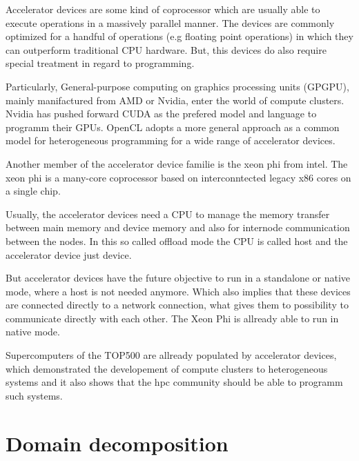Accelerator devices are some kind of coprocessor which are usually
able to execute operations in a massively parallel manner.  The
devices are commonly optimized for a handful of operations (e.g
floating point operations) in which they can outperform traditional
CPU hardware. But, this devices do also require special treatment in
regard to programming.

Particularly, General-purpose computing on graphics processing units
(GPGPU), mainly manifactured from AMD or Nvidia, enter the world of
compute clusters. Nvidia has pushed forward CUDA\cite{ref:cuda} as the
prefered model and language to programm their
GPUs. OpenCL\cite{ref:opencl} adopts a more general approach as a
common model for heterogeneous programming for a wide range of
accelerator devices.

Another member of the accelerator device familie is the xeon
phi\cite{ref:xeon_phi} from intel. The xeon phi is a many-core
coprocessor based on interconntected legacy x86 cores on a single chip.

Usually, the accelerator devices need a CPU to manage the memory
transfer between main memory and device memory and also for internode
communication between the nodes. In this so called offload mode the
CPU is called host and the accelerator device just device.

But accelerator devices have the future objective to run in a
standalone or native mode, where a host is not needed anymore. 
Which also implies that these devices are connected directly to
a network connection, what gives them to possibility to communicate
directly with each other. The Xeon Phi is allready able to run in native mode.

Supercomputers of the TOP500 are allready populated by accelerator
devices, which demonstrated the developement of compute clusters to
heterogeneous systems and it also shows that the hpc community should
be able to programm such systems.

\section{Domain decomposition}
\label{sec:domain_decomposition}

